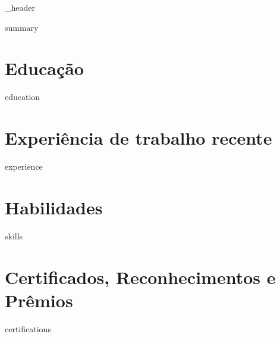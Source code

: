 \documentclass[letter,10pt]{article}
\author{Gabriel Costa De Oliveira} %
\begin{document}
{_header}


\vspace*{21pt}
{summary}
\vspace*{21pt}


\section{\Large Educação}
\vspace*{21pt}
{education}
\vspace*{21pt}




\section{\Large Experiência de trabalho recente}
\vspace*{21pt}
{experience}
\vspace*{21pt}


\section{\Large Habilidades}
\vspace*{21pt}
{skills}
\vspace*{21pt}


\section{\Large Certificados, Reconhecimentos e Prêmios}
\vspace*{21pt}
{certifications}
\vspace*{21pt}


\end{document}

